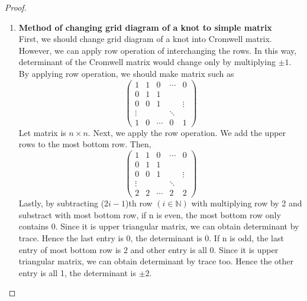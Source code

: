 \documentclass{article}
\theoremstyle{definition}
\theoremstyle{theorem}
\theoremstyle{proposition}
\theoremstyle{corollary}
\begin{document}
\begin{proof}
\begin{enumerate}
    \item \textbf{Method of changing grid diagram of a knot to simple matrix}\\
    First, we should change grid diagram of a knot into Cromwell matrix. However, we can apply row operation of interchanging the rows. In this way, determinant of the Cromwell matrix would change only by multiplying $\pm 1$.\\
By applying row operation, we should make matrix such as
    $$\begin{pmatrix} 
    1 & 1 & 0 & \cdots & 0\\
    0 & 1 & 1 &  &  \\
    0 & 0 & 1 & & \vdots\\ 
    \vdots & & & \ddots & \\
    1 & 0 & \cdots & 0 & 1
    \end{pmatrix}$$
Let matrix is $n\times n$.
Next, we apply the row operation. We add the upper rows to the most bottom row. Then,
    $$\begin{pmatrix} 
    1 & 1 & 0 & \cdots & 0\\
    0 & 1 & 1 &  &  \\
    0 & 0 & 1 & & \vdots\\ 
    \vdots & & & \ddots & \\
    2 & 2 & \cdots & 2 & 2
    \end{pmatrix}$$
Lastly, by subtracting ($2i-1$)th row $(i \in \mathbb{N})$ with multiplying row by 2 and substract with most bottom row, if n is even, the most bottom row only contains 0. Since it is upper triangular matrix, we can obtain determinant by trace. Hence the last entry is 0, the determinant is 0. If n is odd, the last entry of most bottom row is 2 and other entry is all 0. Since it is upper triangular matrix, we can obtain determinant by trace too. Hence the other entry is all 1, the determinant is $\pm 2$.\\


\end{enumerate}
\end{proof}
\end{document}
